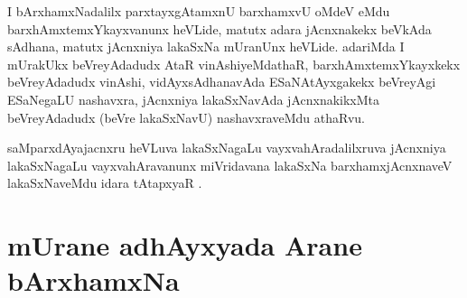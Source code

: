 
\begin{artha}
I bArxhamxNadalilx parxtayxgAtamxnU barxhamxvU oMdeV eMdu barxhAmxtemxYkayxvanunx heVLide, matutx adara jAcnxnakekx beVkAda sAdhana, matutx jAcnxniya lakaSxNa mUranUnx heVLide. adariMda I mUrakUkx beVreyAdadudx AtaR vinAshiyeMdathaR, barxhAmxtemxYkayxkekx beVreyAdadudx vinAshi, vidAyxsAdhanavAda ESaNAtAyxgakekx beVreyAgi ESaNegaLU nashavxra, jAcnxniya lakaSxNavAda jAcnxnakikxMta beVreyAdadudx (beVre lakaSxNavU) nashavxraveMdu athaRvu.
\end{artha}

\begin{artha}
saMparxdAyajacnxru heVLuva lakaSxNagaLu vayxvahAradalilxruva jAcnxniya lakaSxNagaLu vayxvahAravanunx miVridavana lakaSxNa barxhamxjAcnxnaveV lakaSxNaveMdu idara tAtapxyaR .
\end{artha}




\section*{mUrane adhAyxyada Arane bArxhamxNa}

